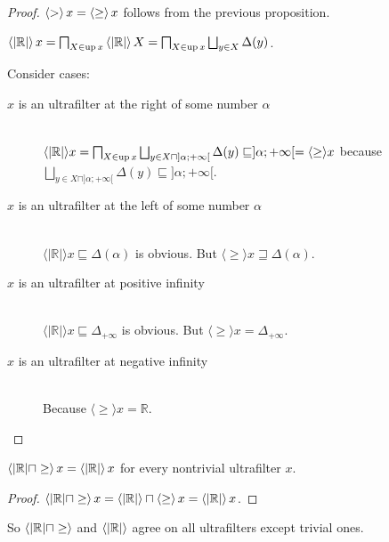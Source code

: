 \begin{proof}
$\left\langle >\right\rangle x = \left\langle \geq\right\rangle x$ follows from the previous proposition.

$\supfun{\lvert \mathbb{R} \rvert } x = \bigsqcap_{X \in \up x} \supfun{\lvert \mathbb{R} \rvert } X =
\bigsqcap_{X \in \up x} \bigsqcup_{y \in X} \Delta (y)$.

Consider cases:

\begin{description}
  \item[$x$ is an ultrafilter at the right of some number $\alpha$] \hfill \\ $\langle
  | \mathbb{R} | \rangle x = \bigsqcap_{X \in \up x} \bigsqcup_{y \in
  X \sqcap] \alpha ; + \infty [} \Delta (y) \sqsubseteq] \alpha ; + \infty
  [= \langle \geq \rangle x$ because $\bigsqcup_{y \in X \sqcap] \alpha ; +
  \infty [} \Delta (y) \sqsubseteq] \alpha ; + \infty [$.
  
  \item[$x$
  is an ultrafilter at the left of some number $\alpha$] \hfill \\ $\langle |
  \mathbb{R} | \rangle x \sqsubseteq \Delta (\alpha)$ is obvious. But
  $\langle \geq \rangle x \sqsupseteq \Delta (\alpha)$.
  
  \item[$x$ is an ultrafilter at positive infinity] \hfill \\ $\langle | \mathbb{R} |
  \rangle x \sqsubseteq \Delta_{+ \infty}$ is obvious. But $\langle \geq
  \rangle x = \Delta_{+ \infty}$.
  
  \item[$x$ is an ultrafilter at negative infinity] \hfill \\ Because $\langle \geq
  \rangle x =\mathbb{R}$.
\end{description}
\end{proof}

\begin{cor}
$\left\langle  | \mathbb{R} | \sqcap \geq \right\rangle x = \left\langle  | \mathbb{R} |
\right\rangle x$ for every nontrivial ultrafilter $x$.
\end{cor}

\begin{proof}
$\left\langle  | \mathbb{R} | \sqcap \geq \right\rangle x = \left\langle  | \mathbb{R} | \right\rangle \sqcap \left\langle \geq\right\rangle x =
\left\langle  | \mathbb{R} | \right\rangle x$.
\end{proof}

So $\left\langle  | \mathbb{R} | \sqcap \geq \right\rangle$ and $\left\langle  | \mathbb{R} | \right\rangle$ agree on all ultrafilters except trivial ones.

